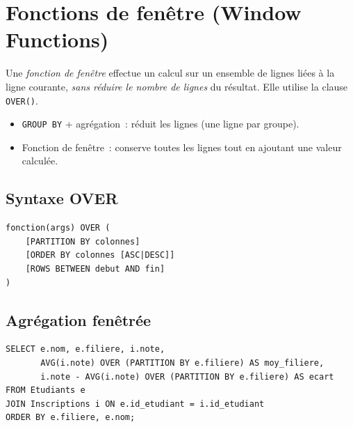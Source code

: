 \section{Fonctions de fen\^etre (Window Functions)}

\begin{definition}
Une \emph{fonction de fen\^etre} effectue un calcul sur un ensemble de lignes
li\'ees \`a la ligne courante, \emph{sans r\'eduire le nombre de lignes}
du r\'esultat. Elle utilise la clause \texttt{OVER()}.
\end{definition}

\begin{theoreme}
\begin{itemize}
    \item \texttt{GROUP BY} + agr\'egation~: r\'eduit les lignes (une ligne par groupe).
    \item Fonction de fen\^etre~: conserve toutes les lignes tout en ajoutant
          une valeur calcul\'ee.
\end{itemize}
\end{theoreme}

\subsection{Syntaxe OVER}

\begin{formules}[title=\textbf{Syntaxe des fonctions de fen\^etre}]
\begin{verbatim}
fonction(args) OVER (
    [PARTITION BY colonnes]
    [ORDER BY colonnes [ASC|DESC]]
    [ROWS BETWEEN debut AND fin]
)
\end{verbatim}
\end{formules}

\subsection{Agr\'egation fen\^etr\'ee}

\begin{codeblock}[title=\textbf{Moyenne fen\^etr\'ee par fili\`ere}]
\begin{verbatim}
SELECT e.nom, e.filiere, i.note,
       AVG(i.note) OVER (PARTITION BY e.filiere) AS moy_filiere,
       i.note - AVG(i.note) OVER (PARTITION BY e.filiere) AS ecart
FROM Etudiants e
JOIN Inscriptions i ON e.id_etudiant = i.id_etudiant
ORDER BY e.filiere, e.nom;
\end{verbatim}
\end{codeblock}

